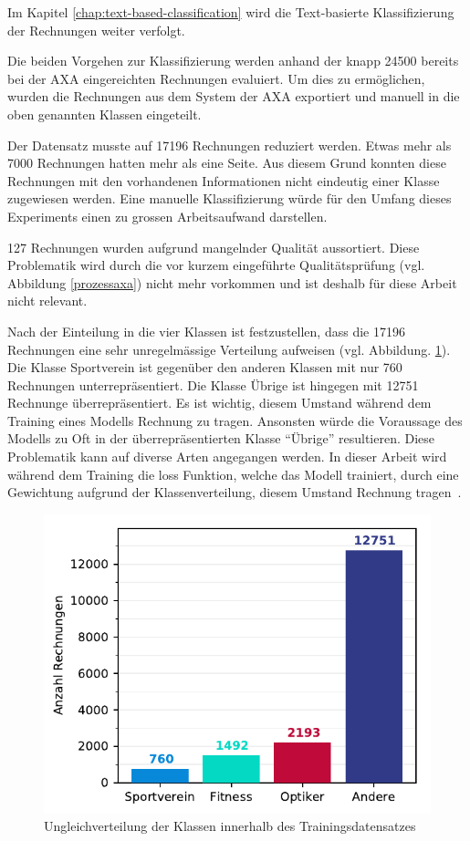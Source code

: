 Im Kapitel \ref{chap:text-based-classification} wird die Text-basierte Klassifizierung der Rechnungen weiter verfolgt.

Die beiden Vorgehen zur Klassifizierung werden anhand der knapp 24500 bereits bei der AXA eingereichten Rechnungen evaluiert. Um dies zu ermöglichen, wurden die Rechnungen aus dem System der AXA exportiert und manuell in die oben genannten Klassen eingeteilt. 

Der Datensatz musste auf 17196 Rechnungen reduziert werden. Etwas mehr als 7000 Rechnungen hatten mehr als eine Seite. Aus diesem Grund konnten diese Rechnungen mit den vorhandenen Informationen nicht eindeutig einer Klasse zugewiesen werden. Eine manuelle Klassifizierung würde für den Umfang dieses Experiments einen zu grossen Arbeitsaufwand darstellen.

127 Rechnungen wurden aufgrund mangelnder Qualität aussortiert. Diese Problematik wird durch die vor kurzem eingeführte Qualitätsprüfung (vgl. Abbildung \ref{prozessaxa}) nicht mehr vorkommen und ist deshalb für diese Arbeit nicht relevant.

Nach der Einteilung in die vier Klassen ist festzustellen, dass die 17196 Rechnungen eine sehr unregelmässige Verteilung aufweisen (vgl. Abbildung. \ref{class-distribution}). Die Klasse Sportverein ist gegenüber den anderen Klassen mit nur 760 Rechnungen unterrepräsentiert. Die Klasse Übrige ist hingegen mit 12751 Rechnunge überrepräsentiert. Es ist wichtig, diesem Umstand während dem Training eines Modells Rechnung zu tragen. Ansonsten würde die Voraussage des Modells zu Oft in der überrepräsentierten Klasse \enquote{Übrige} resultieren. Diese Problematik kann auf diverse Arten angegangen werden. In dieser Arbeit wird während dem Training die loss Funktion, welche das Modell trainiert, durch eine Gewichtung aufgrund der Klassenverteilung, diesem Umstand Rechnung tragen~\autocite{Buda2018}.

\begin{figure}[h]
    \captionsetup{width=.9\linewidth}
    \caption{Ungleichverteilung der Klassen innerhalb des Trainingsdatensatzes}
    \label{class-distribution}
    \centering
    \includegraphics[scale=1]{graphics/matplot/class-weight.pdf}
\end{figure}
